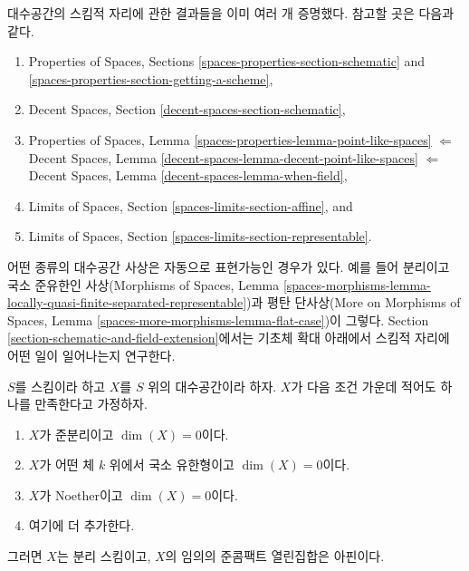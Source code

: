 \noindent
대수공간의 스킴적 자리에 관한 결과들을 이미 여러 개 증명했다. 참고할
곳은 다음과 같다.
\begin{enumerate}
\item Properties of Spaces, Sections
\ref{spaces-properties-section-schematic} and
\ref{spaces-properties-section-getting-a-scheme},
\item Decent Spaces, Section \ref{decent-spaces-section-schematic},
\item Properties of Spaces, Lemma
\ref{spaces-properties-lemma-point-like-spaces}
$\Leftarrow$
Decent Spaces, Lemma \ref{decent-spaces-lemma-decent-point-like-spaces}
$\Leftarrow$
Decent Spaces, Lemma \ref{decent-spaces-lemma-when-field},
\item Limits of Spaces, Section \ref{spaces-limits-section-affine}, and
\item Limits of Spaces, Section \ref{spaces-limits-section-representable}.
\end{enumerate}
어떤 종류의 대수공간 사상은 자동으로 표현가능인 경우가 있다. 예를
들어 분리이고 국소 준유한인 사상(Morphisms of Spaces, Lemma
\ref{spaces-morphisms-lemma-locally-quasi-finite-separated-representable})과
평탄 단사상(More on Morphisms of Spaces, Lemma
\ref{spaces-more-morphisms-lemma-flat-case})이 그렇다. Section
\ref{section-schematic-and-field-extension}에서는 기초체 확대 아래에서
스킴적 자리에 어떤 일이 일어나는지 연구한다.

\begin{lemma}
\label{lemma-locally-finite-type-dim-zero}
$S$를 스킴이라 하고 $X$를 $S$ 위의 대수공간이라 하자. $X$가 다음
조건 가운데 적어도 하나를 만족한다고 가정하자.
\begin{enumerate}
\item $X$가 준분리이고 $\dim(X) = 0$이다.
\item $X$가 어떤 체 $k$ 위에서 국소 유한형이고 $\dim(X) = 0$이다.
\item $X$가 Noether이고 $\dim(X) = 0$이다.
\item 여기에 더 추가한다.
\end{enumerate}
그러면 $X$는 분리 스킴이고, $X$의 임의의 준콤팩트 열린집합은
아핀이다.
\end{lemma}


